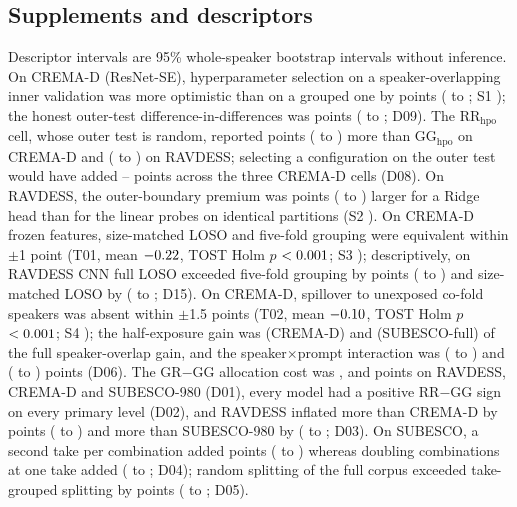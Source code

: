 \documentclass{article}
\begin{document}
\subsection{Supplements and descriptors}
Descriptor intervals are 95\% whole-speaker bootstrap intervals without inference.
On CREMA-D (ResNet-SE), hyperparameter selection on a speaker-overlapping inner validation was more optimistic than on a grouped one by \HNOneFourMean{} points (\HNOneFourCILow{} to \HNOneFourCIHigh; S1 \ClaimSOne); the honest outer-test difference-in-differences was \DNine{} points (\DNineLo{} to \DNineHi; D09).
The RR$_{\mathrm{hpo}}$ cell, whose outer test is random, reported \DEightRRminusGG{} points (\DEightRRminusGGLo{} to \DEightRRminusGGHi) more than GG$_{\mathrm{hpo}}$ on CREMA-D and \DEightRRminusGGRav{} (\DEightRRminusGGRavLo{} to \DEightRRminusGGRavHi) on RAVDESS; selecting a configuration on the outer test would have added \DEightOptimismGR{}--\DEightOptimismGG{} points across the three CREMA-D cells (D08).
On RAVDESS, the outer-boundary premium was \HNOneFiveMean{} points (\HNOneFiveCILow{} to \HNOneFiveCIHigh) larger for a Ridge head than for the linear probes on identical partitions (S2 \ClaimSTwo).
On CREMA-D frozen features, size-matched LOSO and five-fold grouping were equivalent within $\pm$1 point (T01, mean $-0.22$, TOST Holm $p$ $<0.001$; S3 \ClaimSThree); descriptively, on RAVDESS CNN full LOSO exceeded five-fold grouping by \DFifteenLOSOminusGFive{} points (\DFifteenLOSOminusGFiveLo{} to \DFifteenLOSOminusGFiveHi) and size-matched LOSO by \DFifteenSUBminusGFive{} (\DFifteenSUBminusGFiveLo{} to \DFifteenSUBminusGFiveHi; D15).
On CREMA-D, spillover to unexposed co-fold speakers was absent within $\pm$1.5 points (T02, mean $-0.10$, TOST Holm $p$ $<0.001$; S4 \ClaimSFour); the half-exposure gain was \DSixShareCre{} (CREMA-D) and \DSixShareSub{} (SUBESCO-full) of the full speaker-overlap gain, and the speaker$\times$prompt interaction was \DSixInterCre{} (\DSixInterCreLo{} to \DSixInterCreHi) and \DSixInterSub{} (\DSixInterSubLo{} to \DSixInterSubHi) points (D06).
The GR$-$GG allocation cost was \DOneScratchRav, \DOneScratchCre{} and \DOneScratchSub{} points on RAVDESS, CREMA-D and SUBESCO-980 (D01), every model had a positive RR$-$GG sign on every primary level (D02), and RAVDESS inflated more than CREMA-D by \DThreeRavCre{} points (\DThreeRavCreLo{} to \DThreeRavCreHi) and more than SUBESCO-980 by \DThreeRavSub{} (\DThreeRavSubLo{} to \DThreeRavSubHi; D03).
On SUBESCO, a second take per combination added \DFourTakes{} points (\DFourTakesLo{} to \DFourTakesHi) whereas doubling combinations at one take added \DFourCells{} (\DFourCellsLo{} to \DFourCellsHi; D04); random splitting of the full corpus exceeded take-grouped splitting by \DFive{} points (\DFiveLo{} to \DFiveHi; D05).
\end{document}
